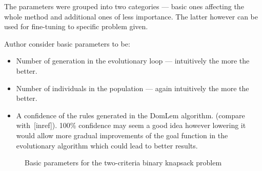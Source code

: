 The parameters were grouped into two categories --- basic ones affecting the
whole method and additional ones of less importance. The latter however can be
used for fine-tuning to specific problem given.

Author consider basic parameters to be:
\begin{itemize}
\item Number of generation in the evolutionary loop --- intuitively the more
  the better.
\item Number of individuals in the population --- again intuitively the more
  the better.
\item A confidence of the rules generated in the DomLem algorithm. (compare
  with~[inref]). 100\% confidence may seem a good idea however lowering it
  would allow more gradual improvements of the goal function in the
  evolutionary algorithm which could lead to better results.
\end{itemize}


\begin{figure}
  \centering
  \caption{Basic parameters for the two-criteria binary knapsack problem}
  \label{c2_params}
\end{figure}


